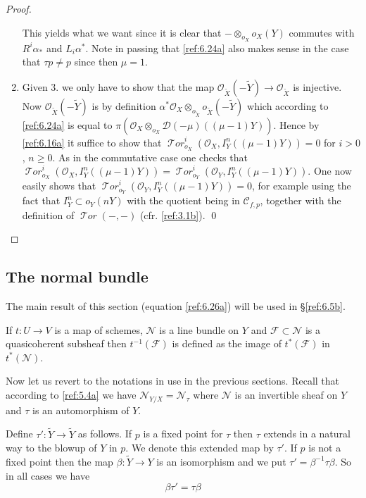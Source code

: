 \documentclass{amsproc}
\def\Cscr{{\mathcal C}}
\def\Dscr{{\mathcal D}}
\def\Fscr{{\mathcal F}}
\def\Nscr{{\mathcal N}}
\def\Oscr{{\mathcal O}}
\def\Tscr{{\mathcal T}}
\def\HTor{\operatorname {\Tscr \mathit{or}}}
\def\HTor{\operatorname {\Tscr \mathit{or}}}
\def\r{\rightarrow}
\theoremstyle{definition}
\theoremstyle{remark}
\numberwithin{equation}{section}
\numberwithin{table}{section}
\numberwithin{figure}{section}
\begin{document}
\begin{proof}
\begin{enumerate}
This yields what we want   since it is clear that 
$-\otimes_{o_X} o_X(Y)$ commutes with $R^i\alpha_\ast$ and
$L_i\alpha^\ast$. Note in passing that \eqref{ref:6.24a} also makes
sense in the case that $\tau p\neq p$ since then $\mu=1$.
\item Given 3. we only have to show that the map
  $\Oscr_{\tilde{X}}(-\tilde{Y})\r \Oscr_{\tilde{X}}$ is injective.
  Now $\Oscr_{\tilde{X}}(-\tilde{Y})$ is by definition
  $\alpha^\ast\Oscr_X\otimes_{o_{\tilde{X}}}
  o_{\tilde{X}}(-\tilde{Y})$ which according to 
  \eqref{ref:6.24a} is equal to $\pi(\Oscr_X\otimes_{o_X}
  \Dscr(-\mu)((\mu-1)Y))$. Hence by \eqref{ref:6.16a} it suffice to
  show that $\HTor_{o_X}^i(\Oscr_X,I^n_Y((\mu-1)Y))=0$ for $i>0$,
  $n\ge 0$. As in the commutative case one checks that
  $\HTor_{o_X}^i(\Oscr_X,I^n_Y((\mu-1)Y))=
  \HTor_{o_Y}^i(\Oscr_Y,I^n_Y((\mu-1)Y))$.  One now easily shows that
  $\HTor_{o_Y}^i(\Oscr_Y,I^n_Y((\mu-1)Y))=0$, for example using the
  fact that $I^n_Y\subset o_Y(nY)$ with the quotient being in
  $\Cscr_{f,p}$, together with the definition of $\HTor(-,-)$ (cfr.
  \eqref{ref:3.1b}).
\qed \end{enumerate}
\def\qed{}\end{proof}

\subsection{The normal bundle}
\label{ref:6.4b}
The main result of this section (equation \eqref{ref:6.26a}) will
be used in \S\ref{ref:6.5b}.



If $t:U\r V$ is a map of schemes, $\Nscr$ is a line bundle on $Y$ and
$\Fscr\subset \Nscr$ is a quasicoherent subsheaf then $t^{-1}(\Fscr)$
is defined as the image of $t^\ast(\Fscr)$ in $t^\ast(\Nscr)$. 

Now let us revert to the notations in use in the previous
sections. Recall that according to \eqref{ref:5.4a} we have $\Nscr_{Y/X}
=\Nscr_\tau$ where $\Nscr$ is an invertible sheaf on $Y$ and $\tau$ is
an automorphism of $Y$.

Define $\tau':{\tilde{Y}}\r {\tilde{Y}}$ as follows. If $p$ is a fixed point for
$\tau$ then $\tau$ extends in a natural way to the blowup of $Y$ in
$p$. We denote this extended map by $\tau'$. If $p$ is not a fixed
point then the map $\beta:{\tilde{Y}}\r Y$ is an isomorphism and we put
$\tau'=\beta^{-1}\tau\beta$. So in all cases we have
\begin{equation}
\label{ref:6.25a}
\beta\tau'=\tau\beta
\end{equation}
\end{document}
